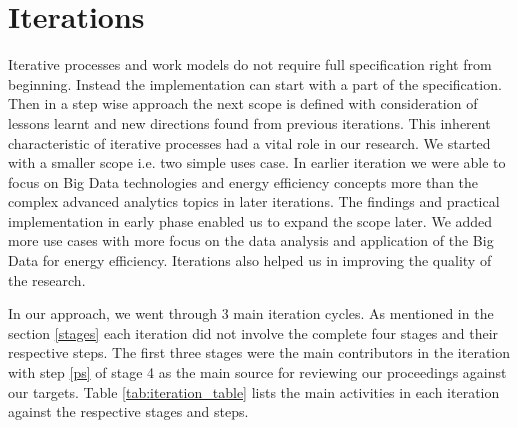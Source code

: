 \section{Iterations} \label{iteration}
Iterative processes and work models do not require full specification right from beginning. Instead the implementation can start with a part of the specification. Then in a step wise approach the next scope is defined with consideration of lessons learnt and new directions found from previous iterations. This inherent characteristic of iterative processes had a vital role in our research. We started with a smaller scope i.e. two simple uses case. In earlier iteration we were able to focus on Big Data technologies and energy efficiency concepts more than the complex advanced analytics topics in later iterations. The findings and practical implementation in early phase enabled us to expand the scope later. We added more use cases with more focus on the data analysis and application of the Big Data for energy efficiency. Iterations also helped us in improving the quality of the research. 

In our approach, we went through 3 main iteration cycles. As mentioned in the section \ref{stages} each iteration did not involve the complete four stages and their respective steps. The first three stages were the main contributors in the iteration with step \ref{ps} of stage 4 as the main source for reviewing our proceedings against our targets. Table \ref{tab:iteration_table} lists the main activities in each iteration against the respective stages and steps.    

